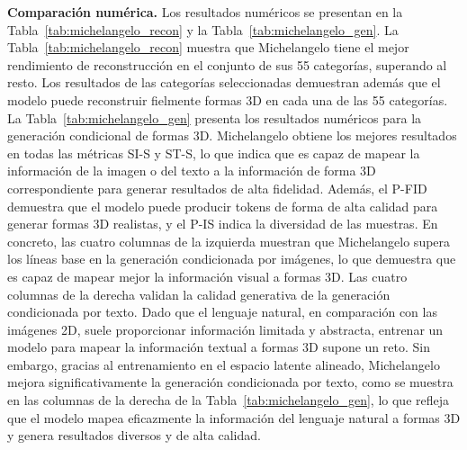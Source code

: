 \documentclass[../../book-main_es.tex]{subfiles}
\begin{document}
\textbf{Comparación numérica.}
Los resultados numéricos se presentan en
la Tabla~\ref{tab:michelangelo_recon} y la Tabla~\ref{tab:michelangelo_gen}.
La Tabla~\ref{tab:michelangelo_recon} muestra que Michelangelo tiene el
mejor rendimiento de reconstrucción en el conjunto de sus 55 categorías, superando
al resto. Los resultados de las categorías seleccionadas demuestran además que
el modelo puede reconstruir fielmente formas 3D en cada una de las 55 categorías.
La Tabla~\ref{tab:michelangelo_gen} presenta los resultados numéricos para la
generación condicional de formas 3D.
Michelangelo obtiene los mejores resultados en todas las métricas SI-S y ST-S,
lo que indica que es capaz de mapear la información de la imagen o
del texto a la información de forma 3D correspondiente para generar
resultados de alta fidelidad. Además, el P-FID demuestra que el
modelo puede producir tokens de forma de alta calidad para generar
formas 3D realistas, y el P-IS indica la diversidad de las muestras.
En concreto, las cuatro columnas de la izquierda muestran que Michelangelo supera
los líneas base en la generación condicionada por imágenes, lo que demuestra que
es capaz de mapear mejor la información visual a formas 3D.
Las cuatro columnas de la derecha validan la calidad generativa de
la generación condicionada por texto. Dado que el lenguaje natural, en comparación con las imágenes 2D,
suele proporcionar información limitada y abstracta, entrenar un
modelo para mapear la información textual a formas 3D supone un reto. Sin embargo,
gracias al entrenamiento en el espacio latente alineado, Michelangelo
mejora significativamente la generación condicionada por texto, como se muestra en
las columnas de la derecha de la Tabla~\ref{tab:michelangelo_gen}, lo que refleja
que el modelo mapea eficazmente la información del lenguaje natural a formas 3D
y genera resultados diversos y de alta calidad.
\end{document}
